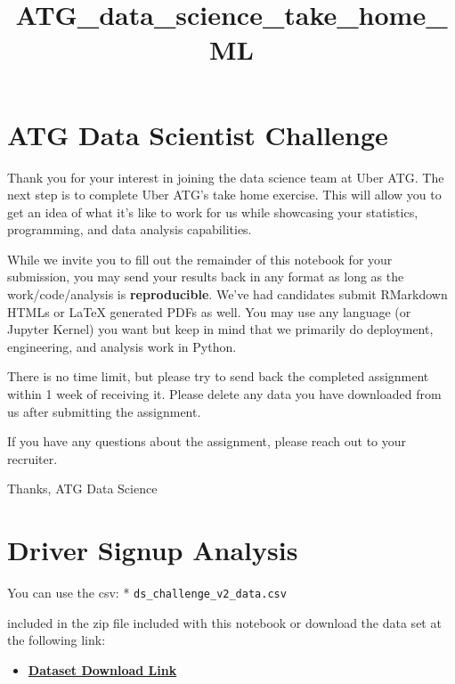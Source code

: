 \documentclass[11pt]{article}
\title{ATG\_data\_science\_take\_home\_ML}
\providecommand{\tightlist}{%
      \setlength{\itemsep}{0pt}\setlength{\parskip}{0pt}}
\begin{document}
    
    
    \maketitle
    
    

    
    \section{ATG Data Scientist
Challenge}\label{atg-data-scientist-challenge}

Thank you for your interest in joining the data science team at Uber
ATG. The next step is to complete Uber ATG's take home exercise. This
will allow you to get an idea of what it's like to work for us while
showcasing your statistics, programming, and data analysis capabilities.

While we invite you to fill out the remainder of this notebook for your
submission, you may send your results back in any format as long as the
work/code/analysis is \textbf{reproducible}. We've had candidates submit
RMarkdown HTMLs or LaTeX generated PDFs as well. You may use any
language (or Jupyter Kernel) you want but keep in mind that we primarily
do deployment, engineering, and analysis work in Python.

There is no time limit, but please try to send back the completed
assignment within 1 week of receiving it. Please delete any data you
have downloaded from us after submitting the assignment.

If you have any questions about the assignment, please reach out to your
recruiter.

Thanks, ATG Data Science

    \section{Driver Signup Analysis}\label{driver-signup-analysis}

You can use the csv: * \texttt{ds\_challenge\_v2\_data.csv}

included in the zip file included with this notebook or download the
data set at the following link:

\begin{itemize}
\tightlist
\item
  \href{https://drive.google.com/a/uber.com/file/d/0BxkZqrCogcyWbUs2Smhlc0VSams/view?usp=drive_web}{\textbf{Dataset
  Download Link}}
\end{itemize}
\end{document}
